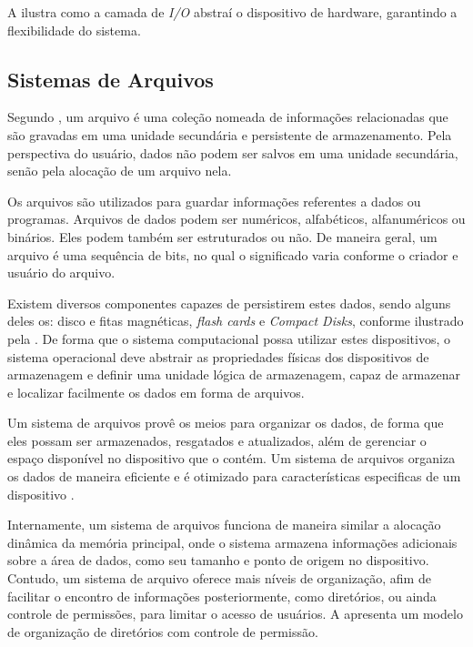 A  ilustra como a camada de \emph{I/O} abstraí o dispositivo de hardware, garantindo a flexibilidade do sistema.


\subsection{Sistemas de Arquivos}

Segundo , um arquivo é uma coleção nomeada de informações relacionadas que são gravadas em uma unidade secundária e persistente de armazenamento. Pela perspectiva do usuário, dados não podem ser salvos em uma unidade secundária, senão pela alocação de um arquivo nela.

Os arquivos são utilizados para guardar informações referentes a dados ou programas. Arquivos de dados podem ser numéricos, alfabéticos, alfanuméricos ou binários. Eles podem também ser estruturados ou não. De maneira geral, um arquivo é uma sequência de bits, no qual o significado varia conforme o criador e usuário do arquivo.

Existem diversos componentes capazes de persistirem estes dados, sendo alguns deles os: disco e fitas magnéticas, \emph{flash cards} e \emph{Compact Disks}, conforme ilustrado pela . De forma que o sistema computacional possa utilizar estes dispositivos, o sistema operacional deve abstrair as propriedades físicas dos dispositivos de armazenagem e definir uma unidade lógica de armazenagem, capaz de armazenar e localizar facilmente os dados em forma de arquivos. 


Um sistema de arquivos provê os meios para organizar os dados, de forma que eles possam ser armazenados, resgatados e atualizados, além de gerenciar o espaço disponível no dispositivo que o contém. Um sistema de arquivos organiza os dados de maneira eficiente e é otimizado para características especificas de um dispositivo \cite{file_system}.

Internamente, um sistema de arquivos funciona de maneira similar a alocação dinâmica da memória principal, onde o sistema armazena informações adicionais sobre a área de dados, como seu tamanho e ponto de origem no dispositivo. Contudo, um sistema de arquivo oferece mais níveis de organização, afim de facilitar o encontro de informações posteriormente, como diretórios, ou ainda controle de permissões, para limitar o acesso de usuários. A  apresenta um modelo de organização de diretórios com controle de permissão.

